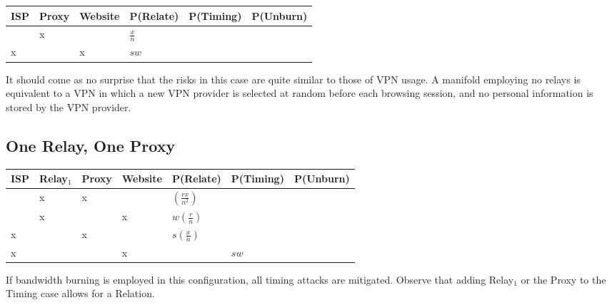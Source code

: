 
\begin{center}
\begin{tabular}{l | l | l | l | l | l}
  ISP & Proxy & Website & P(Relate)          & P(Timing) & P(Unburn) \\
  \hline
      & x     &         & $\frac{x}{n}$      & & \\
  \hline
  x   &       & x       & $sw$               & & \\
\end{tabular}
\end{center}

It should come as no surprise that the risks in this case are quite
similar to those of VPN usage. A manifold employing no relays is
equivalent to a VPN in which a new VPN provider is selected at random
before each browsing session, and no personal information is stored by
the VPN provider.

\subsection{One Relay, One Proxy}


\begin{center}
\begin{tabular}{l | l | l | l | l | l | l}
  ISP & Relay$_1$ & Proxy & Website & P(Relate)          & P(Timing) & P(Unburn) \\
  \hline
      & x         & x     &         & $(\frac{rx}{n^2})$ & & \\
  \hline
      & x         &       & x       & $w(\frac{r}{n})$   & & \\
  \hline
  x   &           & x     &         & $s(\frac{x}{n})$   & & \\
  \hline
  x   &           &       & x       &                    & $sw$ & \\
\end{tabular}
\end{center}

If bandwidth burning is employed in this configuration, all timing
attacks are mitigated. Observe that adding Relay$_1$ or the Proxy to
the Timing case allows for a Relation.

